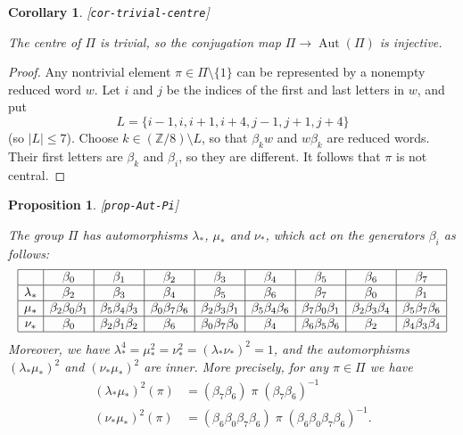\documentclass[reqno]{amsart}
\newcommand{\lbl}[1]{\label{#1}\textup{[\texttt{#1}]}\par}
\newcommand{\lbl}{\label}
\newcommand{\Aut}	{\operatorname{Aut}}
\newcommand{\bt}        {\beta}
\newcommand{\lm}        {\lambda}
\newcommand{\Z}         {{\mathbb{Z}}}
\newcommand{\sm}        {\setminus}
\renewcommand{\:}{\colon}
\newtheorem{proposition}[theorem]{Proposition}
\newtheorem{corollary}[theorem]{Corollary}
\theoremstyle{definition}
\begin{document}
\begin{corollary}\lbl{cor-trivial-centre}
 The centre of $\Pi$ is trivial, so the conjugation map
 $\Pi\to\Aut(\Pi)$ is injective.
\end{corollary}
\begin{proof}
 Any nontrivial element $\pi\in\Pi\sm\{1\}$ can be represented by a
 nonempty reduced word $w$.  Let $i$ and $j$ be the
 indices of the first and last letters in $w$, and put
 \[ L = \{i-1,i,i+1,i+4,j-1,j+1,j+4\} \]
 (so $|L|\leq 7$).  Choose $k\in(\Z/8)\sm L$, so that $\bt_kw$ and
 $w\bt_k$ are reduced words.  Their first letters are $\bt_k$ and
 $\bt_i$, so they are different.  It follows that $\pi$ is
 not central.
\end{proof}

\begin{proposition}\lbl{prop-Aut-Pi}
 The group $\Pi$ has automorphisms $\lm_*$, $\mu_*$ and $\nu_*$, which
 act on the generators $\bt_i$ as follows:
 \[ \begin{array}{|c|c|c|c|c|c|c|c|c|} \hline
     & \bt_0 & \bt_1 & \bt_2 & \bt_3 & \bt_4 & \bt_5 & \bt_6 & \bt_7
     \\ \hline
     \lm_* &
     \bt_2 & \bt_3 & \bt_4 & \bt_5 & \bt_6 & \bt_7 & \bt_0 & \bt_1
     \\ \hline
     \mu_* &
     \bt_2\bt_0\bt_1 &
     \bt_5\bt_4\bt_3 &
     \bt_0\bt_7\bt_6 &
     \bt_2\bt_3\bt_1 &
     \bt_5\bt_4\bt_6 &
     \bt_7\bt_0\bt_1 &
     \bt_2\bt_3\bt_4 &
     \bt_5\bt_7\bt_6 \\ \hline
     \nu_* &
     \bt_0 &
     \bt_2\bt_1\bt_2 &
     \bt_6 &
     \bt_0\bt_7\bt_0 &
     \bt_4 &
     \bt_6\bt_5\bt_6 &
     \bt_2 &
     \bt_4\bt_3\bt_4 \\ \hline
    \end{array}
 \]
 Moreover, we have $\lm_*^4=\mu_*^2=\nu_*^2=(\lm_*\nu_*)^2=1$, and the
 automorphisms $(\lm_*\mu_*)^2$ and $(\nu_*\mu_*)^2$ are inner.  More precisely, for
 any $\pi\in\Pi$ we have
 \begin{align*}
  (\lm_*\mu_*)^2(\pi) &=
       (\bt_7\bt_6)\;\pi\;(\bt_7\bt_6)^{-1} \\
  (\nu_*\mu_*)^2(\pi) &=
       (\bt_6\bt_0\bt_7\bt_6)\;\pi\;(\bt_6\bt_0\bt_7\bt_6)^{-1}.
 \end{align*}
\end{proposition}
\end{document}
